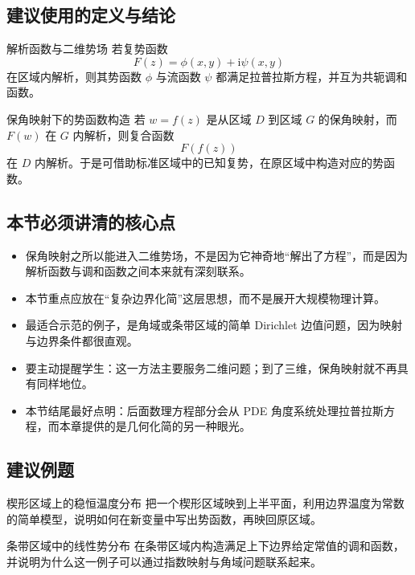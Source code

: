 \subsection*{建议使用的定义与结论}
\begin{dingli}{解析函数与二维势场}{}
若复势函数
\[
    F(z)=\phi(x,y)+\mathrm{i}\psi(x,y)
\]
在区域内解析，则其势函数 $\phi$ 与流函数 $\psi$ 都满足拉普拉斯方程，并互为共轭调和函数。
\end{dingli}

\begin{dingli}{保角映射下的势函数构造}{}
若 $w=f(z)$ 是从区域 $D$ 到区域 $G$ 的保角映射，而 $F(w)$ 在 $G$ 内解析，则复合函数
\[
    F(f(z))
\]
在 $D$ 内解析。于是可借助标准区域中的已知复势，在原区域中构造对应的势函数。
\end{dingli}

\subsection*{本节必须讲清的核心点}
\begin{itemize}
    \item 保角映射之所以能进入二维势场，不是因为它神奇地``解出了方程''，而是因为解析函数与调和函数之间本来就有深刻联系。
    \item 本节重点应放在``复杂边界化简''这层思想，而不是展开大规模物理计算。
    \item 最适合示范的例子，是角域或条带区域的简单 Dirichlet 边值问题，因为映射与边界条件都很直观。
    \item 要主动提醒学生：这一方法主要服务二维问题；到了三维，保角映射就不再具有同样地位。
    \item 本节结尾最好点明：后面数理方程部分会从 PDE 角度系统处理拉普拉斯方程，而本章提供的是几何化简的另一种眼光。
\end{itemize}

\subsection*{建议例题}
\begin{lizi}{楔形区域上的稳恒温度分布}{}
把一个楔形区域映到上半平面，利用边界温度为常数的简单模型，说明如何在新变量中写出势函数，再映回原区域。
\end{lizi}

\begin{lizi}{条带区域中的线性势分布}{}
在条带区域内构造满足上下边界给定常值的调和函数，并说明为什么这一例子可以通过指数映射与角域问题联系起来。
\end{lizi}

